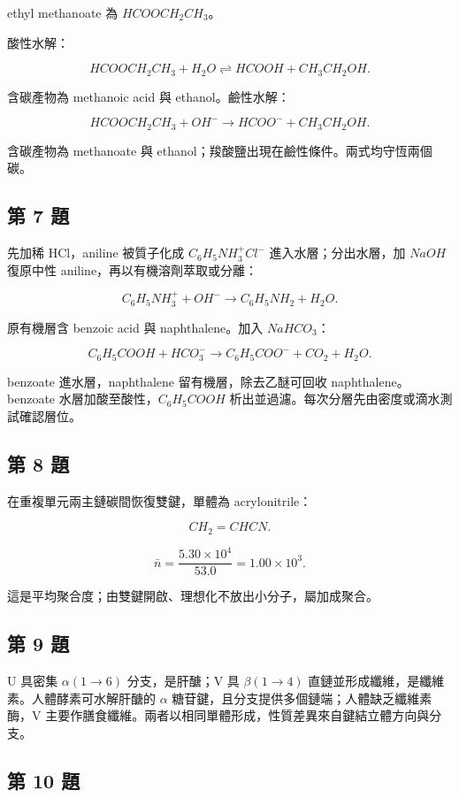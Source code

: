 \documentclass[11pt,a4paper]{article}
\begin{document}
ethyl methanoate 為 \(HCOOCH_2CH_3\)。

酸性水解：

\[
HCOOCH_2CH_3+H_2O\rightleftharpoons HCOOH+CH_3CH_2OH.
\]

含碳產物為 methanoic acid 與 ethanol。鹼性水解：

\[
HCOOCH_2CH_3+OH^-\rightarrow HCOO^-+CH_3CH_2OH.
\]

含碳產物為 methanoate 與 ethanol；羧酸鹽出現在鹼性條件。兩式均守恆兩個碳。

\subsection{第 7 題}\label{ux7b2c-7-ux984c}

先加稀 HCl，aniline 被質子化成 \(C_6H_5NH_3^+Cl^-\) 進入水層；分出水層，加 \(NaOH\) 復原中性 aniline，再以有機溶劑萃取或分離：

\[
C_6H_5NH_3^++OH^-\rightarrow C_6H_5NH_2+H_2O.
\]

原有機層含 benzoic acid 與 naphthalene。加入 \(NaHCO_3\)：

\[
C_6H_5COOH+HCO_3^-\rightarrow C_6H_5COO^-+CO_2+H_2O.
\]

benzoate 進水層，naphthalene 留有機層，除去乙醚可回收 naphthalene。benzoate 水層加酸至酸性，\(C_6H_5COOH\) 析出並過濾。每次分層先由密度或滴水測試確認層位。

\subsection{第 8 題}\label{ux7b2c-8-ux984c}

在重複單元兩主鏈碳間恢復雙鍵，單體為 acrylonitrile：

\[
CH_2=CHCN.
\]

\[
\bar n=\frac{5.30\times10^4}{53.0}=1.00\times10^3.
\]

這是平均聚合度；由雙鍵開啟、理想化不放出小分子，屬加成聚合。

\subsection{第 9 題}\label{ux7b2c-9-ux984c}

U 具密集 \(\alpha(1\rightarrow6)\) 分支，是肝醣；V 具 \(\beta(1\rightarrow4)\) 直鏈並形成纖維，是纖維素。人體酵素可水解肝醣的 \(\alpha\) 糖苷鍵，且分支提供多個鏈端；人體缺乏纖維素酶，V 主要作膳食纖維。兩者以相同單體形成，性質差異來自鍵結立體方向與分支。

\subsection{第 10 題}\label{ux7b2c-10-ux984c}
\end{document}
